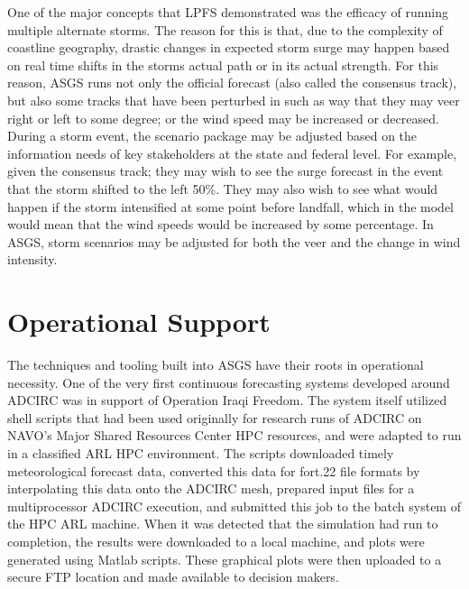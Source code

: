 \documentclass{article}
\begin{document}
One of the major concepts that LPFS demonstrated was the efficacy of running
multiple alternate storms. The reason for this is that, due to the complexity of
coastline geography, drastic changes in expected storm surge may happen based on
real time shifts in the storms actual path or in its actual strength. For this
reason, ASGS runs not only the official forecast (also called the consensus
track), but also some tracks that have been perturbed in such as way that they
may veer right or left to some degree; or the wind speed may be increased or
decreased.  During a storm event, the scenario package may be adjusted based on
the information needs of key stakeholders at the state and federal level. For
example, given the consensus track; they may wish to see the surge forecast in
the event that the storm shifted to the left 50\%. They may also wish to see
what would happen if the storm intensified at some point before landfall, which
in the model would mean that the wind speeds would be increased by some
percentage. In ASGS, storm scenarios may be adjusted for both the veer and the
change in wind intensity.

\section{Operational Support}

The techniques and tooling built into ASGS have their roots in operational
necessity. One of the very first continuous forecasting systems developed around
ADCIRC was in support of Operation Iraqi Freedom\cite{blain2005high}. The system itself
utilized shell scripts that had been used originally for research runs of ADCIRC
on NAVO's Major Shared Resources Center HPC resources, and were adapted to run
in a classified ARL HPC environment. The scripts downloaded timely
meteorological forecast data, converted this data for fort.22 file formats by
interpolating this data onto the ADCIRC mesh, prepared input files for a
multiprocessor ADCIRC execution, and submitted this job to the batch system of
the HPC ARL machine. When it was detected that the simulation had run to
completion, the results were downloaded to a local machine, and plots were
generated using Matlab scripts. These graphical plots were then uploaded to a
secure FTP location and made available to decision makers.
\end{document}
